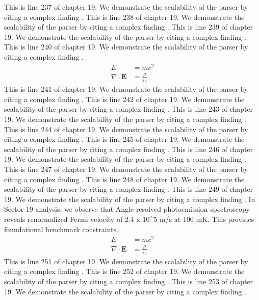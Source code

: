 This is line 237 of chapter 19. We demonstrate the scalability of the parser by citing a complex finding \cite{ref19_237}.
This is line 238 of chapter 19. We demonstrate the scalability of the parser by citing a complex finding \cite{ref19_238}.
This is line 239 of chapter 19. We demonstrate the scalability of the parser by citing a complex finding \cite{ref19_239}.
This is line 240 of chapter 19. We demonstrate the scalability of the parser by citing a complex finding \cite{ref19_240}.
\begin{align*}
  E &= mc^2 \\
  \nabla \cdot \mathbf{E} &= \frac{\rho}{\varepsilon_0}
\end{align*}
This is line 241 of chapter 19. We demonstrate the scalability of the parser by citing a complex finding \cite{ref19_241}.
This is line 242 of chapter 19. We demonstrate the scalability of the parser by citing a complex finding \cite{ref19_242}.
This is line 243 of chapter 19. We demonstrate the scalability of the parser by citing a complex finding \cite{ref19_243}.
This is line 244 of chapter 19. We demonstrate the scalability of the parser by citing a complex finding \cite{ref19_244}.
This is line 245 of chapter 19. We demonstrate the scalability of the parser by citing a complex finding \cite{ref19_245}.
This is line 246 of chapter 19. We demonstrate the scalability of the parser by citing a complex finding \cite{ref19_246}.
This is line 247 of chapter 19. We demonstrate the scalability of the parser by citing a complex finding \cite{ref19_247}.
This is line 248 of chapter 19. We demonstrate the scalability of the parser by citing a complex finding \cite{ref19_248}.
This is line 249 of chapter 19. We demonstrate the scalability of the parser by citing a complex finding \cite{ref19_249}.
In Sector 19 analysis, we observe that Angle-resolved photoemission spectroscopy reveals renormalized Fermi velocity of 2.4 x 10^5 m/s at 100 mK. This provides foundational benchmark constraints.
\begin{align*}
  E &= mc^2 \\
  \nabla \cdot \mathbf{E} &= \frac{\rho}{\varepsilon_0}
\end{align*}
This is line 251 of chapter 19. We demonstrate the scalability of the parser by citing a complex finding \cite{ref19_251}.
This is line 252 of chapter 19. We demonstrate the scalability of the parser by citing a complex finding \cite{ref19_252}.
This is line 253 of chapter 19. We demonstrate the scalability of the parser by citing a complex finding \cite{ref19_253}.
